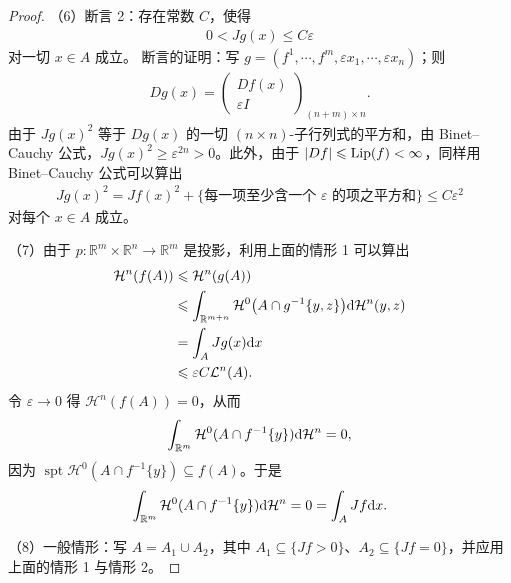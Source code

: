 \documentclass[../../main.tex]{subfiles}%
\begin{document}
\begin{proof}
（6）断言 2：存在常数 $C$，使得
\begin{align*}
0<Jg(x)\leqslant C\varepsilon
\end{align*}
对一切 $x\in A$ 成立。
断言的证明：写 $g=(f^1,\cdots,f^m,\varepsilon x_1,\cdots,\varepsilon x_n)$；则
\begin{align*}
Dg(x)=\begin{pmatrix}Df(x)\\ \varepsilon I\end{pmatrix}_{(n+m)\times n}.
\end{align*}
由于 $Jg(x)^2$ 等于 $Dg(x)$ 的一切 $(n\times n)$-子行列式的平方和，由 Binet--Cauchy 公式，$Jg(x)^2\geqslant\varepsilon^{2n}>0$。此外，由于 $\lvert Df\rvert\leqslant\operatorname{Lip}(f)<\infty$，同样用 Binet--Cauchy 公式可以算出
\begin{align*}
Jg(x)^2=Jf(x)^2+\bigl\{\text{每一项至少含一个 }\varepsilon\text{ 的项之平方和}\bigr\}\leqslant C\varepsilon^2
\end{align*}
对每个 $x\in A$ 成立。

（7）由于 $p:\mathbb{R}^m\times\mathbb{R}^n\to\mathbb{R}^m$ 是投影，利用上面的情形 1 可以算出
\begin{align*}
\mathcal{H}^n(f(A))&\leqslant\mathcal{H}^n(g(A))\\
&\leqslant\int_{\mathbb{R}^{m+n}}\mathcal{H}^0\bigl(A\cap g^{-1}\{y,z\}\bigr)\mathrm{d}\mathcal{H}^n(y,z)\\
&=\int_AJg(x)\mathrm{d} x\\
&\leqslant\varepsilon C\mathcal{L}^n(A).
\end{align*}
令 $\varepsilon\to0$ 得 $\mathcal{H}^n(f(A))=0$，从而
\begin{align*}
\int_{\mathbb{R}^m}\mathcal{H}^0(A\cap f^{-1}\{y\})\mathrm{d}\mathcal{H}^n=0,
\end{align*}
因为 $\operatorname{spt}\mathcal{H}^0(A\cap f^{-1}\{y\})\subseteq f(A)$。于是
\begin{align*}
\int_{\mathbb{R}^m}\mathcal{H}^0(A\cap f^{-1}\{y\})\mathrm{d}\mathcal{H}^n=0=\int_AJf\mathrm{d} x .
\end{align*}

（8）一般情形：写 $A=A_1\cup A_2$，其中 $A_1\subseteq\{Jf>0\}$、$A_2\subseteq\{Jf=0\}$，并应用上面的情形 1 与情形 2。
\end{proof}
\end{document}

